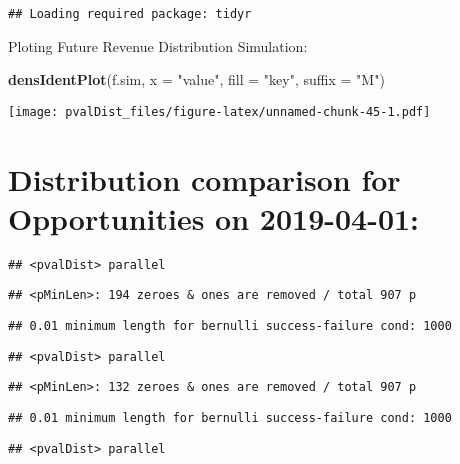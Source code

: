 \documentclass[]{article}
\newenvironment{Shaded}{\begin{snugshade}}{\end{snugshade}}
\newcommand{\DataTypeTok}[1]{\textcolor[rgb]{0.13,0.29,0.53}{#1}}
\newcommand{\KeywordTok}[1]{\textcolor[rgb]{0.13,0.29,0.53}{\textbf{#1}}}
\newcommand{\NormalTok}[1]{#1}
\newcommand{\StringTok}[1]{\textcolor[rgb]{0.31,0.60,0.02}{#1}}
\begin{document}
\begin{verbatim}
## Loading required package: tidyr
\end{verbatim}

Ploting Future Revenue Distribution Simulation:

\begin{Shaded}
\begin{Highlighting}[]
\KeywordTok{densIdentPlot}\NormalTok{(f.sim, }\DataTypeTok{x =} \StringTok{"value"}\NormalTok{, }\DataTypeTok{fill =} \StringTok{"key"}\NormalTok{, }\DataTypeTok{suffix =} \StringTok{"M"}\NormalTok{)}
\end{Highlighting}
\end{Shaded}

\texttt{[image: pvalDist\_files/figure-latex/unnamed-chunk-45-1.pdf]}

\hypertarget{distribution-comparison-for-opportunities-on-2019-04-01}{%
\section{Distribution comparison for Opportunities on
2019-04-01:}\label{distribution-comparison-for-opportunities-on-2019-04-01}}

\begin{verbatim}
## <pvalDist> parallel
\end{verbatim}

\begin{verbatim}
## <pMinLen>: 194 zeroes & ones are removed / total 907 p
\end{verbatim}

\begin{verbatim}
## 0.01 minimum length for bernulli success-failure cond: 1000
\end{verbatim}

\begin{verbatim}
## <pvalDist> parallel
\end{verbatim}

\begin{verbatim}
## <pMinLen>: 132 zeroes & ones are removed / total 907 p
\end{verbatim}

\begin{verbatim}
## 0.01 minimum length for bernulli success-failure cond: 1000
\end{verbatim}

\begin{verbatim}
## <pvalDist> parallel
\end{verbatim}
\end{document}
